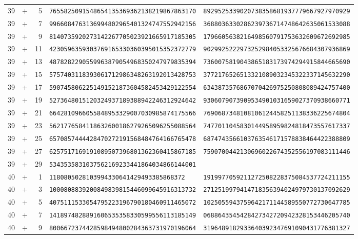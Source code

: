 \begin{longtable}{@{}rcrll@{}}
39&+&5&\texttt{7655825091548654135369362138219867863170}&\texttt{8929525339020738358681937779667927970929}\\
39&+&7&\texttt{9966084763136994802965401324747552942156}&\texttt{3688036330286239736714748642635061533088}\\
39&+&9&\texttt{8140735920273142267705023921665917185305}&\texttt{1796605638216498560791753632609672692985}\\
39&+&11&\texttt{4230596359303769165330360395015352372779}&\texttt{9029925222973252984053325676684307936869}\\
39&+&13&\texttt{4878282290559963879054968350247979835394}&\texttt{7360075819043865183173974294915844665690}\\
39&+&15&\texttt{5757403118393061712986348263192013428753}&\texttt{3772176526513321089032345322337145632290}\\
39&+&17&\texttt{5907458062251491521873604582453429122554}&\texttt{6343873576867070426975250808089424757400}\\
39&+&19&\texttt{5273648015120324937189388942246312924642}&\texttt{9306079073909534901031659027370938660771}\\
39&+&21&\texttt{6642810966055848953329007030985874175566}&\texttt{7690687348108106124458251138336225674804}\\
39&+&23&\texttt{5621776584118632600186279265096255088564}&\texttt{7477011045830144958959824818473557617337}\\
39&+&25&\texttt{6570857444428470272191568484764166765478}&\texttt{6874743566103763546171578838464422388809}\\
39&+&27&\texttt{6257517169191089507396801362360415867185}&\texttt{7590700442130696022674352556197083111446}\\
39&+&29&\texttt{5343535831037562169233441864034866144001}&\texttt{}\\
40&+&1&\texttt{1180805028103994330641429493385868372}&\texttt{1919977059211272508228375084537724211155}\\
40&+&3&\texttt{1000808839200849839815446099645916313732}&\texttt{2712519979414718356394024979730137092629}\\
40&+&5&\texttt{4075111533054795223196790180460911465072}&\texttt{1025055943759642171144589550772730647785}\\
40&+&7&\texttt{1418974828891606535358330599556113185149}&\texttt{0688643545428427342720942328153446205740}\\
40&+&9&\texttt{8006672374428598494800284363731970196064}&\texttt{3196489182933640392347691090431776381327}\\

\end{longtable}
